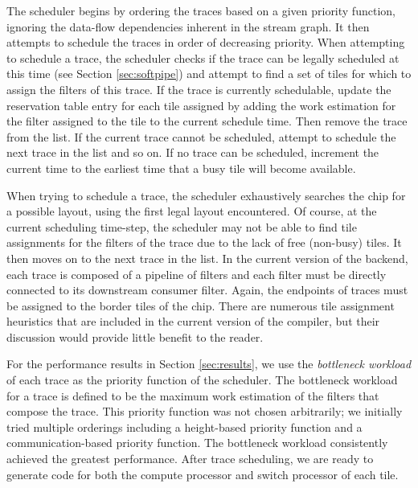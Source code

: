 The scheduler begins by ordering the traces based on a given priority
function, ignoring the data-flow dependencies inherent in the stream
graph.  It then attempts to schedule the traces in order of decreasing
priority.  When attempting to schedule a trace, the scheduler checks
if the trace can be legally scheduled at this time (see Section
\ref{sec:softpipe}) and attempt to find a set of tiles for which to
assign the filters of this trace. If the trace is currently
schedulable, update the reservation table entry for each tile assigned
by adding the work estimation for the filter assigned to the tile to
the current schedule time. Then remove the trace from the list.  If
the current trace cannot be scheduled, attempt to schedule the next
trace in the list and so on.  If no trace can be scheduled, increment
the current time to the earliest time that a busy tile will become
available.

When trying to schedule a trace, the scheduler exhaustively searches
the chip for a possible layout, using the first legal layout
encountered. Of course, at the current scheduling time-step, the
scheduler may not be able to find tile assignments for the filters of
the trace due to the lack of free (non-busy) tiles.  It then moves on
to the next trace in the list. In the current version of the backend,
each trace is composed of a pipeline of filters and each filter must
be directly connected to its downstream consumer filter.  Again, the
endpoints of traces must be assigned to the border tiles of the chip.
There are numerous tile assignment heuristics that are included in the
current version of the compiler, but their discussion would provide
little benefit to the reader.

For the performance results in Section \ref{sec:results}, we use the
{\it bottleneck workload} of each trace as the priority function of
the scheduler. The bottleneck workload for a trace is defined to be
the maximum work estimation of the filters that compose the trace.
This priority function was not chosen arbitrarily; we initially tried
multiple orderings including a height-based priority function and a
communication-based priority function.
The bottleneck workload consistently achieved the greatest
performance. After trace scheduling, we are ready to generate code for
both the compute processor and switch processor of each tile.
